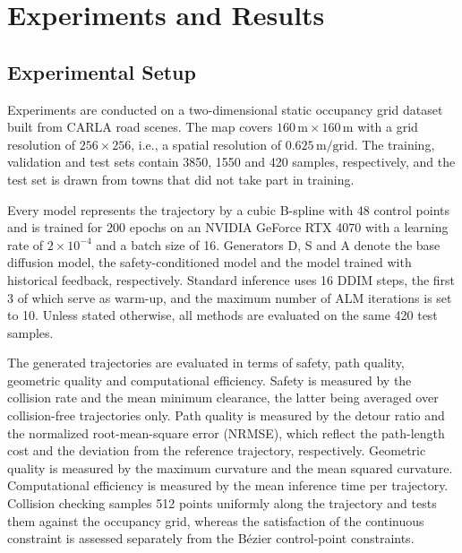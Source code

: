 \documentclass[journal]{IEEEtran}
\begin{document}
\section{Experiments and Results}

\subsection{Experimental Setup}
Experiments are conducted on a two-dimensional static occupancy grid dataset
built from CARLA road scenes. The map covers
$160\,\mathrm{m}\times160\,\mathrm{m}$ with a grid resolution of $256\times256$,
i.e., a spatial resolution of $0.625\,\mathrm{m/grid}$. The training, validation
and test sets contain 3850, 1550 and 420 samples, respectively, and the test set
is drawn from towns that did not take part in training.

Every model represents the trajectory by a cubic B-spline with 48 control points
and is trained for 200 epochs on an NVIDIA GeForce RTX 4070 with a learning rate
of $2\times10^{-4}$ and a batch size of 16. Generators D, S and A denote the base
diffusion model, the safety-conditioned model and the model trained with
historical feedback, respectively. Standard inference uses 16 DDIM steps, the
first 3 of which serve as warm-up, and the maximum number of ALM iterations is
set to 10. Unless stated otherwise, all methods are evaluated on the same 420
test samples.

The generated trajectories are evaluated in terms of safety, path quality,
geometric quality and computational efficiency. Safety is measured by the
collision rate and the mean minimum clearance, the latter being averaged over
collision-free trajectories only. Path quality is measured by the detour ratio
and the normalized root-mean-square error (NRMSE), which reflect the path-length
cost and the deviation from the reference trajectory, respectively. Geometric
quality is measured by the maximum curvature and the mean squared curvature.
Computational efficiency is measured by the mean inference time per trajectory.
Collision checking samples 512 points uniformly along the trajectory and tests
them against the occupancy grid, whereas the satisfaction of the continuous
constraint is assessed separately from the B\'ezier control-point constraints.
\end{document}
